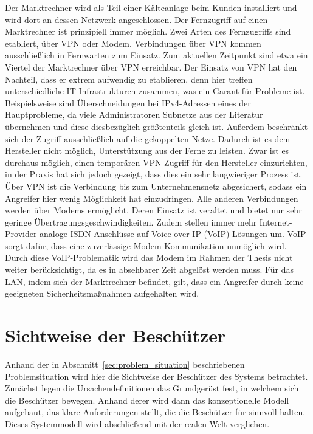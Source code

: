 \documentclass[11pt,a4paper]{report}
\begin{document}
Der Marktrechner wird als Teil einer Kälteanlage beim Kunden installiert und wird dort an dessen Netzwerk angeschlossen. Der Fernzugriff auf einen Marktrechner ist prinzipiell immer möglich. Zwei Arten des Fernzugriffs sind etabliert, über VPN oder Modem. Verbindungen über VPN kommen ausschließlich in Fernwarten zum Einsatz. Zum aktuellen Zeitpunkt sind etwa ein Viertel der Marktrechner über VPN erreichbar. Der Einsatz von VPN hat den Nachteil, dass er extrem aufwendig zu etablieren, denn hier treffen unterschiedliche IT-Infrastrukturen zusammen, was ein Garant für Probleme ist. Beispielsweise sind Überschneidungen bei IPv4-Adressen eines der Hauptprobleme, da viele Administratoren Subnetze aus der Literatur übernehmen und diese diesbezüglich größtenteils gleich ist. Außerdem beschränkt sich der Zugriff ausschließlich auf die gekoppelten Netze. Dadurch ist es dem Hersteller nicht möglich, Unterstützung aus der Ferne zu leisten. Zwar ist es durchaus möglich, einen temporären VPN-Zugriff für den Hersteller einzurichten, in der Praxis hat sich jedoch gezeigt, dass dies ein sehr langwieriger Prozess ist. Über VPN ist die Verbindung bis zum Unternehmensnetz abgesichert, sodass ein Angreifer hier wenig Möglichkeit hat einzudringen. Alle anderen Verbindungen werden über Modems ermöglicht. Deren Einsatz ist veraltet und bietet nur sehr geringe Übertragungsgeschwindigkeiten. Zudem stellen immer mehr Internet-Provider analoge ISDN-Anschlüsse auf Voice-over-IP (VoIP) Lösungen um. VoIP sorgt dafür, dass eine zuverlässige Modem-Kommunikation unmöglich wird. Durch diese VoIP-Problematik wird das Modem im Rahmen der Thesis nicht weiter berücksichtigt, da es in absehbarer Zeit abgelöst werden muss. Für das LAN, indem sich der Marktrechner befindet, gilt, dass ein Angreifer durch keine geeigneten Sicherheitsmaßnahmen aufgehalten wird.

\section{Sichtweise der Beschützer} 

Anhand der in Abschnitt~\ref{sec:problem_situation} beschriebenen Problemsituation wird hier die Sichtweise der Beschützer des Systems betrachtet. Zunächst legen die Ursachendefinitionen das Grundgerüst fest, in welchem sich die Beschützer bewegen. Anhand derer wird dann das konzeptionelle Modell aufgebaut, das klare Anforderungen stellt, die die Beschützer für sinnvoll halten. Dieses Systemmodell wird abschließend mit der realen Welt verglichen.
\end{document}

